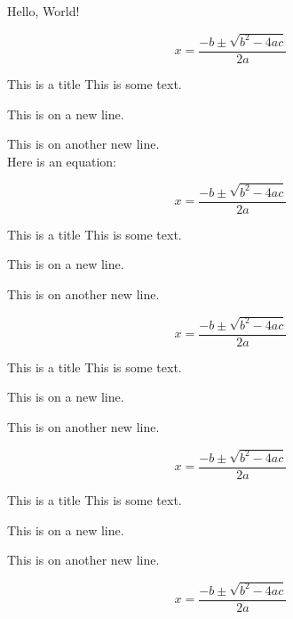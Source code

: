 \begin{multicols}{2}
    Hello, World!

    \lipsum[10]

    \begin{equation*}
        x = \frac{-b \pm \sqrt{b^2 - 4ac}}{2a}
    \end{equation*}

    \Blinddocument

    \nolinenumbers
    \begin{greybox}{This is a title}
        This is some text.

        This is on a new line.

        This is on another new line.\\
        Here is an equation:

        \begin{equation*}
            x = \frac{-b \pm \sqrt{b^2 - 4ac}}{2a}
        \end{equation*}
    \end{greybox}
    \linenumbers

    \begin{redbox}{This is a title}
        This is some text.

        This is on a new line.

        This is on another new line.

        \begin{equation*}
            x = \frac{-b \pm \sqrt{b^2 - 4ac}}{2a}
        \end{equation*}
    \end{redbox}

    \begin{bluebox}{This is a title}
        This is some text.

        This is on a new line.

        This is on another new line.

        \begin{equation*}
            x = \frac{-b \pm \sqrt{b^2 - 4ac}}{2a}
        \end{equation*}
    \end{bluebox}

    \begin{greenbox}{This is a title}
        \linenumbers
        This is some text.

        This is on a new line.

        This is on another new line.

        \begin{equation*}
            x = \frac{-b \pm \sqrt{b^2 - 4ac}}{2a}
        \end{equation*}
        \nolinenumbers
    \end{greenbox}


\end{multicols}
